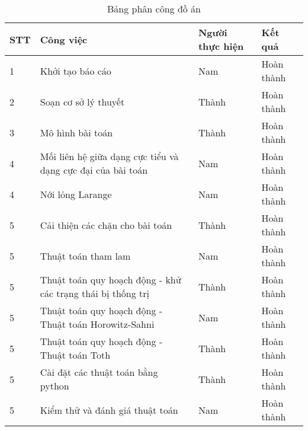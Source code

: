 \begin{table}[H]
\centering
\caption{Bảng phân công đồ án}
\label{tab:phancong0}
\begin{tabular}{lp{4cm}ll}
\hline
\multicolumn{1}{l}{STT} & \multicolumn{1}{p{4cm}}{Công việc}                          & \multicolumn{1}{l}{Người thực hiện} & \multicolumn{1}{l}{Kết quả}    \\ \hline
\multicolumn{1}{l}{1}   & \multicolumn{1}{p{4cm}}{Khởi tạo báo cáo}          & \multicolumn{1}{l}{Nam}             & \multicolumn{1}{l}{Hoàn thành} \\ \hline
\multicolumn{1}{l}{2}   & \multicolumn{1}{p{4cm}}{Soạn cơ sở lý thuyết}   & \multicolumn{1}{l}{Thành}           & \multicolumn{1}{l}{Hoàn thành} \\ \hline
\multicolumn{1}{l}{3}   & \multicolumn{1}{p{4cm}}{Mô hình bài toán}     & \multicolumn{1}{l}{Thành}           & \multicolumn{1}{l}{Hoàn thành} \\ \hline
\multicolumn{1}{l}{4}   & \multicolumn{1}{p{4cm}}{Mối liên hệ giữa dạng cực tiểu và dạng cực đại của bài toán} & \multicolumn{1}{l}{Nam}             & \multicolumn{1}{l}{Hoàn thành} \\ \hline
\multicolumn{1}{l}{4}   & \multicolumn{1}{p{3cm}}{Nới lỏng Larange} & \multicolumn{1}{l}{Nam}             & \multicolumn{1}{l}{Hoàn thành} \\ \hline
\multicolumn{1}{l}{5}   & \multicolumn{1}{p{4cm}}{Cải thiện các chặn cho bài toán}                   & \multicolumn{1}{l}{Thành}           & \multicolumn{1}{l}{Hoàn thành} \\ \hline           
\multicolumn{1}{l}{5}   & \multicolumn{1}{l}{Thuật toán tham lam}                   & \multicolumn{1}{l}{Nam}           & \multicolumn{1}{l}{Hoàn thành} \\ \hline
\multicolumn{1}{l}{5}   & \multicolumn{1}{p{4cm}}{Thuật toán quy hoạch động - khử các trạng thái bị thống trị}                   & \multicolumn{1}{l}{Thành}           & \multicolumn{1}{l}{Hoàn thành} \\ \hline
\multicolumn{1}{l}{5}   & \multicolumn{1}{p{4cm}}{Thuật toán quy hoạch động - Thuật toán Horowitz-Sahni}                   & \multicolumn{1}{l}{Nam}           & \multicolumn{1}{l}{Hoàn thành} \\ \hline
\multicolumn{1}{l}{5}   & \multicolumn{1}{p{4cm}}{Thuật toán quy hoạch động - Thuật toán Toth}                   & \multicolumn{1}{l}{Thành}           & \multicolumn{1}{l}{Hoàn thành} \\ \hline
\multicolumn{1}{l}{5}   & \multicolumn{1}{p{4cm}}{Cài đặt các thuật toán bằng python}                   & \multicolumn{1}{l}{Thành}           & \multicolumn{1}{l}{Hoàn thành} \\ \hline
\multicolumn{1}{l}{5}   & \multicolumn{1}{p{4cm}}{Kiểm thử và đánh giá thuật toán}                   & \multicolumn{1}{l}{Nam}           & \multicolumn{1}{l}{Hoàn thành} \\ \hline
\end{tabular}
\end{table}\textbf{}

